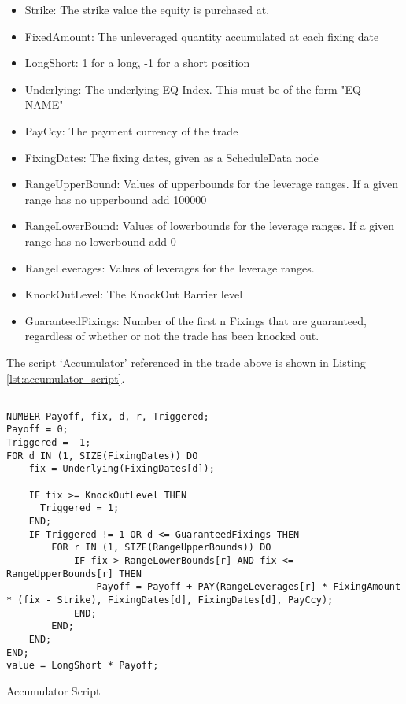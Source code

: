 \begin{itemize}
\item Strike: The strike value the equity is purchased at.
\item FixedAmount: The unleveraged quantity accumulated at each fixing date
\item LongShort: 1 for a long, -1 for a short position
\item Underlying: The underlying EQ Index. This must be of the form "EQ-NAME"
\item PayCcy: The payment currency of the trade
\item FixingDates: The fixing dates, given as a ScheduleData node
\item RangeUpperBound: Values of upperbounds for the leverage ranges. If a given range has no upperbound add 100000
\item RangeLowerBound: Values of lowerbounds for the leverage ranges. If a given range has no lowerbound add 0
\item RangeLeverages: Values of leverages for the leverage ranges.
\item KnockOutLevel: The KnockOut Barrier level
\item GuaranteedFixings: Number of the first n Fixings that are guaranteed, regardless of whether or not the trade has been knocked out.
\end{itemize}

The script `Accumulator' referenced in the trade above is shown in Listing \ref{lst:accumulator_script}.

\begin{listing}[H]
\begin{verbatim}

NUMBER Payoff, fix, d, r, Triggered;
Payoff = 0;
Triggered = -1;
FOR d IN (1, SIZE(FixingDates)) DO
    fix = Underlying(FixingDates[d]);
    
    IF fix >= KnockOutLevel THEN
      Triggered = 1;
    END;
    IF Triggered != 1 OR d <= GuaranteedFixings THEN
        FOR r IN (1, SIZE(RangeUpperBounds)) DO
            IF fix > RangeLowerBounds[r] AND fix <= RangeUpperBounds[r] THEN
                Payoff = Payoff + PAY(RangeLeverages[r] * FixingAmount * (fix - Strike), FixingDates[d], FixingDates[d], PayCcy);
            END;
        END;
    END;
END;
value = LongShort * Payoff;
\end{verbatim}
\caption{Accumulator Script}
\label{lst:accumulator_script}
\end{listing}

